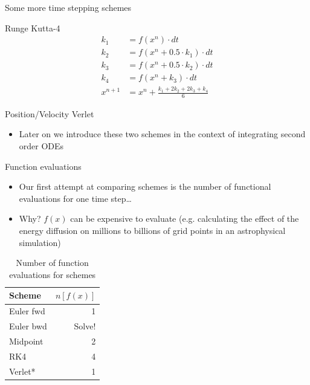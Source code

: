 \documentclass[presentation]{beamer}
\begin{document}
\begin{frame}[label={sec:orgf5a3e42}]{Some more time stepping schemes}
\begin{block}{Runge Kutta-4}
\begin{equation*}
\begin{aligned}
{k}_1 &= {f}({x}^{n}) \cdot dt \\
{k}_2 &= {f}({x}^{n} + 0.5 \cdot {k}_1)\cdot dt \\
{k}_3 &= {f}({x}^{n} + 0.5 \cdot {k}_2)\cdot dt \\
{k}_4 &= {f}({x}^{n} + {k}_3)\cdot dt \\
{x}^{n+1} &= {x}^{n} + \frac{{k}_1+2{k}_2+2{k}_3+{k}_4}{6}
\end{aligned}
\end{equation*}
\end{block}
\begin{block}{Position/Velocity Verlet}
\begin{itemize}
\item Later on we introduce these two schemes in the context of integrating
second order ODEs
\end{itemize}
\end{block}
\end{frame}
\begin{frame}[label={sec:orgf48ca48}]{Function evaluations}
\begin{itemize}
\item Our first attempt at comparing schemes is the number of functional
evaluations for one time step\ldots{}
\item Why? \(f(x)\) can be expensive to evaluate (e.g. calculating the effect
of the energy diffusion on millions to billions of
grid points in an astrophysical simulation)
\end{itemize}
\begin{table}[htbp]
\caption{\label{tab_sym_snake_params}
Number of function evaluations for schemes}
\centering
\begin{tabular}{lr}
\toprule
Scheme & \(n[f(x)]\)\\
\midrule
Euler fwd & 1\\
Euler bwd & Solve!\\
Midpoint & 2\\
RK4 & 4\\
Verlet* & 1\\
\bottomrule
\end{tabular}
\end{table}
\end{frame}
\end{document}
